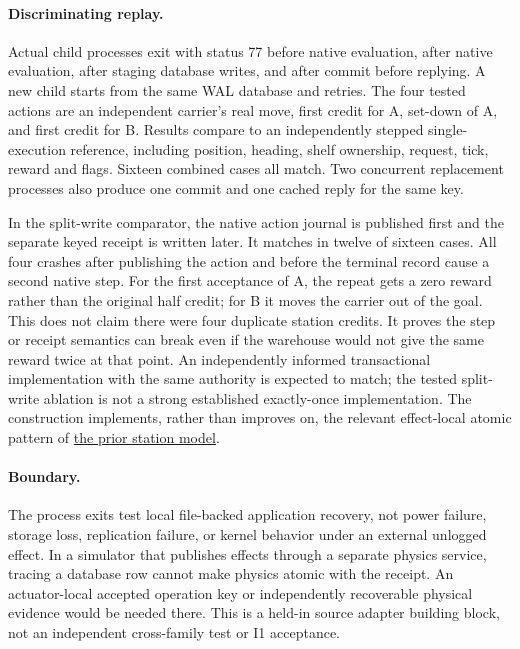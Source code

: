 \documentclass{article}
\begin{document}
\paragraph{Discriminating replay.}
Actual child processes exit with status 77 before native evaluation,
after native evaluation, after staging database writes, and after commit
before replying. A new child starts from the same WAL database and retries.
The four tested actions are an independent carrier's real move, first
credit for A, set-down of A, and first credit for B. Results compare to
an independently stepped single-execution reference, including position,
heading, shelf ownership, request, tick, reward and flags. Sixteen
combined cases all match. Two concurrent replacement processes also
produce one commit and one cached reply for the same key.

In the split-write comparator, the native action journal is published
first and the separate keyed receipt is written later. It matches in
twelve of sixteen cases. All four crashes after publishing the action and
before the terminal record cause a second native step. For the first
acceptance of A, the repeat gets a zero reward rather than the original
half credit; for B it moves the carrier out of the goal. This does not
claim there were four duplicate station credits. It proves the step or
receipt semantics can break even if the warehouse would not give the
same reward twice at that point. An independently informed transactional
implementation with the same authority is expected to match; the tested
split-write ablation is not a strong established exactly-once
implementation. The construction implements, rather than improves on,
the relevant effect-local atomic pattern of
\href{https://github.com/eternal-november/eos-research-programmes/pull/606}{the prior station model}.

\paragraph{Boundary.}
The process exits test local file-backed application recovery, not power
failure, storage loss, replication failure, or kernel behavior under an
external unlogged effect. In a simulator that publishes effects through
a separate physics service, tracing a database row cannot make physics
atomic with the receipt. An actuator-local accepted operation key or
independently recoverable physical evidence would be needed there.
This is a held-in source adapter building block, not an independent
cross-family test or I1 acceptance.
\end{document}
